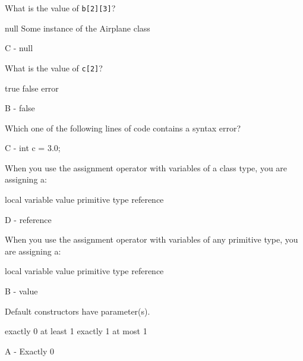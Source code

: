 \documentclass[11pt,answers]{exam}
\begin{document}
\begin{questions}
\question[1] What is the value of {\tt b[2][3]}? \newline
\begin{oneparchoices}
   \choice null \choice Some instance of the Airplane class	
\end{oneparchoices}
\begin{solution}
	C - null
\end{solution}

\question[1] What is the value of {\tt c[2]}? \newline
\begin{oneparchoices}
 \choice true \choice false \choice error
\end{oneparchoices}
\begin{solution}
	B - false
\end{solution}

\question[1] Which one of the following lines of code contains a syntax error? \newline
\begin{oneparchoices}
\end{oneparchoices}
\begin{solution}
	C - int c = 3.0;
\end{solution}

\question[1] When you use the assignment operator with variables of a class type, \newline you are assigning a: \newline
\begin{oneparchoices}
	\choice local variable \choice value \choice primitive type \choice reference
\end{oneparchoices}
\begin{solution}
	D - reference
\end{solution}

\question[1] When you use the assignment operator with variables of any primitive type, \newline you are assigning a: \newline
\begin{oneparchoices}
	\choice local variable \choice value \choice primitive type \choice reference
\end{oneparchoices}
\begin{solution}
	B - value
\end{solution}

\question[1] Default constructors have \makebox[1in]{\hrulefill} parameter(s). \newline
\begin{oneparchoices}
	\choice exactly 0 \choice at least 1 \choice exactly 1 \choice at most 1
\end{oneparchoices}
\begin{solution}
	A - Exactly 0
\end{solution}


\end{questions}
\end{document}
